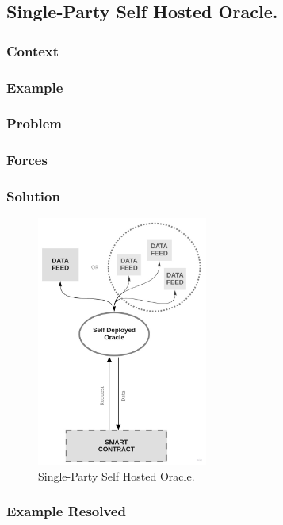 \subsection{Single-Party Self Hosted Oracle.}

\subsubsection{Context}
\subsubsection{Example}
\subsubsection{Problem}
\subsubsection{Forces}
\subsubsection{Solution}

\begin{figure}[t]
  \begin{center}
    \leavevmode
    \includegraphics[width=0.5\textwidth]{figures/oraclearch3.jpg}
    \caption{Single-Party Self Hosted Oracle.}
    \label{fig:/figures/paper-screening}
  \end{center}
\end{figure}


\subsubsection{Example Resolved}
